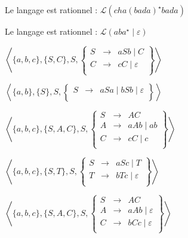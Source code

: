 \begin{corrections}

  \begin{questions}

  \item Le langage est rationnel : $\mathcal{L}(cha (bada)^\star bada)$

  \item Le langage est rationnel : $\mathcal{L}(aba^\star \mid\varepsilon)$

  \item $\left\langle \{a, b, c\}, \{S, C\}, S,
    \left\{\begin{array}{lll}
    S   &\rightarrow& a S b \mid C\\
    C   &\rightarrow& c C \mid \varepsilon\\
    \end{array}\right\}\right\rangle$

  \item $\left\langle \{a, b\}, \{S\}, S,
    \left\{\begin{array}{lll}
    S   &\rightarrow& a S a \mid b S b \mid \varepsilon\\
    \end{array}\right\}\right\rangle$

  \item $\left\langle \{a, b, c\}, \{S, A, C\}, S,
    \left\{\begin{array}{lll}
    S   &\rightarrow& A C\\
    A   &\rightarrow& a A b \mid ab\\
    C   &\rightarrow& c C \mid c\\
    \end{array}\right\}\right\rangle$

  \item $\left\langle \{a, b, c\}, \{S, T\}, S,
    \left\{\begin{array}{lll}
    S   &\rightarrow& a S c \mid T\\
    T   &\rightarrow& b T c \mid \varepsilon\\
    \end{array}\right\}\right\rangle$

  \item $\left\langle \{a, b, c\}, \{S, A, C\}, S,
    \left\{\begin{array}{lll}
    S   &\rightarrow& A C\\
    A   &\rightarrow& a A b \mid \varepsilon\\
    C   &\rightarrow& b C c \mid \varepsilon\\
    \end{array}\right\}\right\rangle$


\end{questions}
\end{corrections}
